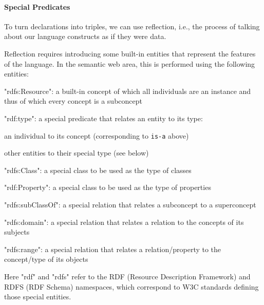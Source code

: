 \paragraph{Special Predicates}
To turn declarations into triples, we can use reflection, i.e., the process of talking about our language constructs as if they were data.

Reflection requires introducing some built-in entities that represent the features of the language.
In the semantic web area, this is performed using the following entities:
\begin{compactitem}
 \item "rdfs:Resource": a built-in concept of which all individuals are an instance and thus of which every concept is a subconcept
 \item "rdf:type": a special predicate that relates an entity to its type:
  \begin{compactitem}
   \item an individual to its concept (corresponding to \texttt{is-a} above)
   \item other entities to their special type (see below)
  \end{compactitem}
 \item "rdfs:Class": a special class to be used as the type of classes
 \item "rdf:Property": a special class to be used as the type of properties
 \item "rdfs:subClassOf": a special relation that relates a subconcept to a superconcept
 \item "rdfs:domain": a special relation that relates a relation to the concepts of its subjects
 \item "rdfs:range": a special relation that relates a relation/property to the concept/type of its objects
\end{compactitem}
Here "rdf" and "rdfs" refer to the RDF (Resource Description Framework) and RDFS (RDF Schema) namespaces, which correspond to W3C standards defining those special entities.

